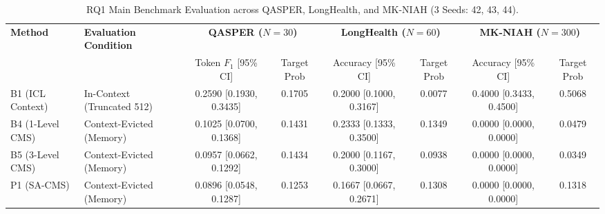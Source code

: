 \begin{table}[t]
\centering
\small
\caption{RQ1 Main Benchmark Evaluation across QASPER, LongHealth, and MK-NIAH (3 Seeds: 42, 43, 44).}
\label{tab:rq1_main}
\begin{tabular}{llcccccc}
\toprule
\textbf{Method} & \textbf{Evaluation Condition} & \multicolumn{2}{c}{\textbf{QASPER ($N=30$)}} & \multicolumn{2}{c}{\textbf{LongHealth ($N=60$)}} & \multicolumn{2}{c}{\textbf{MK-NIAH ($N=300$)}} \\
\cmidrule(lr){3-4} \cmidrule(lr){5-6} \cmidrule(lr){7-8}
 & & Token $F_1$ [95\% CI] & Target Prob & Accuracy [95\% CI] & Target Prob & Accuracy [95\% CI] & Target Prob \\
\midrule
B1 (ICL Context) & In-Context (Truncated 512) & 0.2590 [0.1930, 0.3435] & 0.1705 & 0.2000 [0.1000, 0.3167] & 0.0077 & 0.4000 [0.3433, 0.4500] & 0.5068 \\
B4 (1-Level CMS) & Context-Evicted (Memory) & 0.1025 [0.0700, 0.1368] & 0.1431 & 0.2333 [0.1333, 0.3500] & 0.1349 & 0.0000 [0.0000, 0.0000] & 0.0479 \\
B5 (3-Level CMS) & Context-Evicted (Memory) & 0.0957 [0.0662, 0.1292] & 0.1434 & 0.2000 [0.1167, 0.3000] & 0.0938 & 0.0000 [0.0000, 0.0000] & 0.0349 \\
P1 (SA-CMS)      & Context-Evicted (Memory) & 0.0896 [0.0548, 0.1287] & 0.1253 & 0.1667 [0.0667, 0.2671] & 0.1308 & 0.0000 [0.0000, 0.0000] & 0.1318 \\
\bottomrule
\end{tabular}
\end{table}
